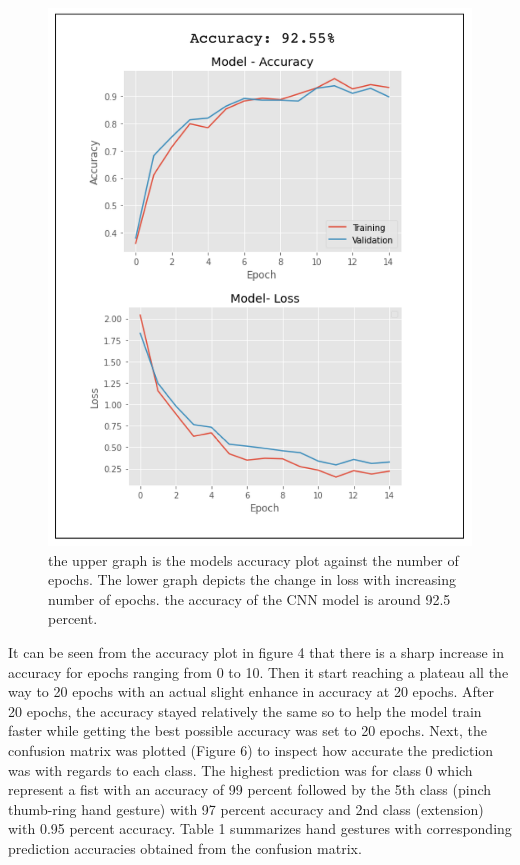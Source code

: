 \documentclass[conference]{IEEEtran}
\begin{document}
\begin{figure}
\centering
\includegraphics[scale = 0.55]{Acc_Loss.png}
\caption{the upper graph is the models accuracy plot against the number of epochs. The lower graph depicts the change in loss with increasing number of epochs. the accuracy of the CNN model is around 92.5 percent.}\end{figure}  It can be seen from the accuracy plot in figure 4 that there is a sharp increase in accuracy for epochs ranging from 0 to 10. Then it start reaching a plateau all the way to 20 epochs with an actual slight enhance in accuracy at 20 epochs. After 20 epochs, the accuracy stayed relatively the same so to help the model train faster while getting the best possible accuracy was set to 20 epochs. 
Next, the confusion matrix was plotted (Figure 6) to inspect how accurate the prediction was with regards to each class. The highest prediction was for class 0 which represent a fist with an accuracy of 99 percent followed by the 5th class (pinch thumb-ring hand gesture) with 97 percent accuracy and 2nd class (extension) with 0.95 percent accuracy. Table 1 summarizes hand gestures with corresponding prediction accuracies obtained from the confusion matrix.\newline
\end{document}
